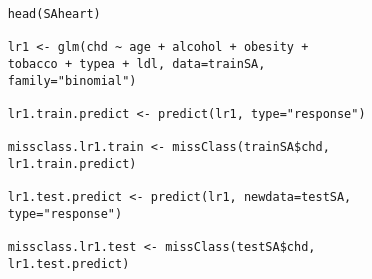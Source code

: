 \documentclass[a4paper,12pt]{article}
\begin{document}
\begin{framed}
	\begin{verbatim}
	head(SAheart)
	
	lr1 <- glm(chd ~ age + alcohol + obesity + 
	tobacco + typea + ldl, data=trainSA, 
	family="binomial")
	
	lr1.train.predict <- predict(lr1, type="response")
	
	missclass.lr1.train <- missClass(trainSA$chd, 
	lr1.train.predict)
	
	lr1.test.predict <- predict(lr1, newdata=testSA, 
	type="response")
	
	missclass.lr1.test <- missClass(testSA$chd, 
	lr1.test.predict)
	\end{verbatim}
\end{framed}
\end{document}
